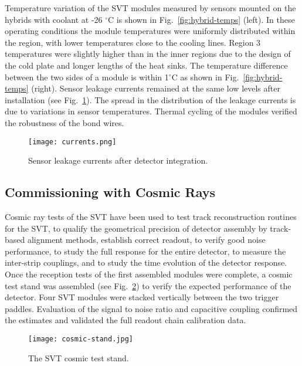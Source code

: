 Temperature variation of the SVT modules measured by sensors mounted on the hybrids with coolant at -26 $^\circ$C is shown in Fig.~\ref{fig:hybrid-temps} (left). In these operating conditions the module temperatures were uniformly distributed within the region, with lower temperatures close to the cooling lines. Region 3 temperatures were slightly higher than in the inner regions due to the design of the cold plate and longer lengths of the heat sinks. The temperature difference between the two sides of a module is within 1$^\circ$C as shown in Fig.~\ref{fig:hybrid-temps} (right). Sensor leakage currents remained at the same low levels after installation (see Fig.~\ref{fig:currents}). The spread in the distribution of the leakage currents is due to variations in sensor temperatures. Thermal cycling of the modules verified the robustness of the bond wires.

\begin{figure}[hbt] 
\centering 
\texttt{[image: currents.png]}
\caption{Sensor leakage currents after detector integration.}
\label{fig:currents}
\end{figure}

\subsection{Commissioning with Cosmic Rays}

Cosmic ray tests of the SVT have been used to test track reconstruction routines for the SVT, to qualify the geometrical precision of detector assembly by track-based alignment methods, establish correct readout, to verify good noise performance, to study the full response for the entire detector, to measure the inter-strip couplings, and to study the time evolution of the detector response. Once the reception tests of the first assembled modules were complete, a cosmic test stand was assembled (see Fig.~\ref{fig:cosmic-stand}) to verify the expected performance of the detector. Four SVT modules were stacked vertically between the two trigger paddles. Evaluation of the signal to noise ratio and capacitive coupling confirmed the estimates and validated the full readout chain calibration data.

\begin{figure}[hbt] 
\centering 
\texttt{[image: cosmic-stand.jpg]}
\caption{The SVT cosmic test stand.}
\label{fig:cosmic-stand}
\end{figure}

